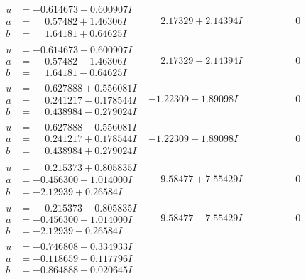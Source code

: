 \documentclass[1p]{elsarticle_modified}
\theoremstyle{definition}
\begin{document}
$$\begin{array}{c|c|c}
\begin{aligned}
u &= -0.614673 + 0.600907 I \\
a &= \phantom{-}0.57482 + 1.46306 I \\
b &= \phantom{-}1.64181 + 0.64625 I\end{aligned}
 & \phantom{-}2.17329 + 2.14394 I & \phantom{-0.000000 } 0 \\ \hline\begin{aligned}
u &= -0.614673 - 0.600907 I \\
a &= \phantom{-}0.57482 - 1.46306 I \\
b &= \phantom{-}1.64181 - 0.64625 I\end{aligned}
 & \phantom{-}2.17329 - 2.14394 I & \phantom{-0.000000 } 0 \\ \hline\begin{aligned}
u &= \phantom{-}0.627888 + 0.556081 I \\
a &= \phantom{-}0.241217 - 0.178544 I \\
b &= \phantom{-}0.438984 - 0.279024 I\end{aligned}
 & -1.22309 - 1.89098 I & \phantom{-0.000000 } 0 \\ \hline\begin{aligned}
u &= \phantom{-}0.627888 - 0.556081 I \\
a &= \phantom{-}0.241217 + 0.178544 I \\
b &= \phantom{-}0.438984 + 0.279024 I\end{aligned}
 & -1.22309 + 1.89098 I & \phantom{-0.000000 } 0 \\ \hline\begin{aligned}
u &= \phantom{-}0.215373 + 0.805835 I \\
a &= -0.456300 + 1.014000 I \\
b &= -2.12939 + 0.26584 I\end{aligned}
 & \phantom{-}9.58477 + 7.55429 I & \phantom{-0.000000 } 0 \\ \hline\begin{aligned}
u &= \phantom{-}0.215373 - 0.805835 I \\
a &= -0.456300 - 1.014000 I \\
b &= -2.12939 - 0.26584 I\end{aligned}
 & \phantom{-}9.58477 - 7.55429 I & \phantom{-0.000000 } 0 \\ \hline\begin{aligned}
u &= -0.746808 + 0.334933 I \\
a &= -0.118659 - 0.117796 I \\
b &= -0.864888 - 0.020645 I\end{aligned}

\end{array}$$
\end{document}

